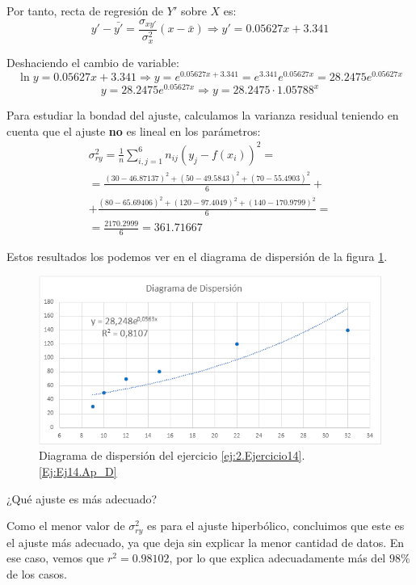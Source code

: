 \begin{ejercicio}
\begin{enumerate}
        Por tanto, recta de regresión de $Y'$ sobre $X$ es:
        \begin{equation*}
            y'-\bar{y'} = \frac{\sigma_{xy'}}{\sigma_{x}^2}(x-\bar{x}) \Longrightarrow y'=0.05627x +3.341
        \end{equation*}

        Deshaciendo el cambio de variable:
        \begin{equation*}
            \ln y=0.05627x +3.341 \Longrightarrow y = e^{0.05627x +3.341} = e^{3.341}e^{0.05627x} = 28.2475e^{0.05627x}
        \end{equation*}
        \begin{equation*}
            y = 28.2475e^{0.05627x} \Longrightarrow y = 28.2475\cdot 1.05788^x
        \end{equation*}
        
        Para estudiar la bondad del ajuste, calculamos la varianza residual teniendo en cuenta que el ajuste \textbf{no} es lineal en los parámetros:
        \begin{multline*}
            \sigma_{ry}^2 = \frac{1}{n} \sum_{i,j=1}^6 n_{ij} (y_j - f(x_i))^2
            =\\=
            \frac{(30-46.87137)^2 + (50-49.5843)^2 + (70-55.4903)^2}{6} +\\+ \frac{(80-65.69406)^2 +(120-97.4049)^2 +(140-170.9799)^2}{6}
            =\\=
            \frac{2170.2999}{6}=361.71667
        \end{multline*}
        

        Estos resultados los podemos ver en el diagrama de dispersión de la figura \ref{fig:Ed14.d}.
        \begin{figure}[H]
            \centering
            \includegraphics[width=0.6\linewidth]{Imagenes/Ej14.d.png}
            \caption{Diagrama de dispersión del ejercicio \ref{ej:2.Ejercicio14}.\ref{Ej:Ej14.Ap_D}}
            \label{fig:Ed14.d}
        \end{figure}
    \end{enumerate}
    
    ¿Qué ajuste es más adecuado?
    
    Como el menor valor de $\sigma_{ry}^2$ es para el ajuste hiperbólico, concluimos que este es el ajuste más adecuado, ya que deja sin explicar la menor cantidad de datos. En ese caso, vemos que $r^2=0.98102$, por lo que explica adecuadamente más del $98\%$ de los casos.
\end{ejercicio}
